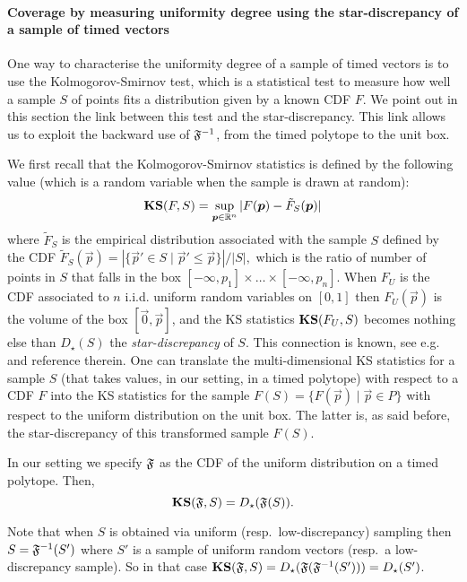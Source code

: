 \paragraph{Coverage by measuring uniformity degree using the star-discrepancy of a sample of timed vectors}\label{sec:KS}\label{sec:backward}
One way to characterise the uniformity degree of a sample of timed vectors is to use the Kolmogorov-Smirnov test, which is a statistical test to measure how well a sample $S$ of points fits a distribution given by a known CDF $F$. We point out in this section the link between this test and the star-discrepancy. This link allows us to exploit the backward use of $\mathfrak{F}^{-1}$, from the timed polytope to the unit box. %

We first recall that the Kolmogorov-Smirnov statistics is defined by the following value (which is a random variable when the sample is drawn at random):
$$\KS(F,S)=\sup_{\vec p\in\R^n}|F(\vec p)-\tilde F_S(\vec p)|$$
where $\tilde F_S$ is the empirical distribution associated with the sample $S$ defined by the CDF 
$\tilde F_S(\vec p)=|\{\vec p'\in S\mid  \vec p'\leq \vec p\}|/|S|,$ which is the ratio of number of points in $S$ that falls in the box $[-\infty, p_1]\times \ldots\times [-\infty, p_n].$ When $F_U$ is the CDF associated to $n$ i.i.d. uniform random variables on $[0,1]$ then  $F_U(\vec p)$ is the volume of the box $[\vec 0, \vec p]$,
and the KS statistics $\mathbf{KS}(F_U,S)$ becomes 
nothing else than $D_{\star}(S)$ the \emph{star-discrepancy} of $S$. This connection is known, see e.g.~\cite{liang2001testing} and reference therein. 
One can translate the multi-dimensional KS statistics  for a sample $S$ (that takes values, in our setting, in a timed polytope) with respect to a CDF $F$  into the KS statistics for the sample $F(S)=\{F(\vec p)\mid \vec p \in P\}$ with respect to the uniform distribution on the unit box. The latter is, as said before, the star-discrepancy of this transformed sample $F(S)$.

In our setting we specify $\mathfrak{F}$ as the CDF of the uniform distribution on a timed polytope. Then,
$$\mathbf{KS}(\mathfrak{F},S)=D_{\star}(\mathfrak{F}(S)).$$

Note that when $S$ is obtained via uniform (resp.~low-discrepancy) sampling then 
$S=\mathfrak{F}^{-1}(S')$ where $S'$ is a sample of uniform random vectors (resp.~a low-discrepancy sample).
So in that case $\mathbf{KS}(\mathfrak{F},S)=D_{\star}(\mathfrak{F}(\mathfrak{F}^{-1}(S')))=D_{\star}(S')$. %


